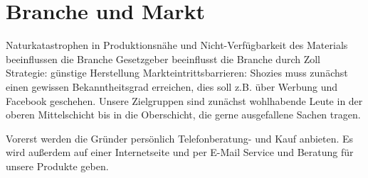 \chapter{Branche und Markt}
\label{cha:4}
Naturkatastrophen in Produktionsnähe und Nicht-Verfügbarkeit des Materials beeinflussen die Branche
Gesetzgeber beeinflusst die Branche durch Zoll
Strategie: günstige Herstellung
Markteintrittsbarrieren: Shozies muss zunächst einen gewissen Bekanntheitsgrad erreichen, dies soll z.B. über Werbung und Facebook geschehen.
Unsere Zielgruppen sind zunächst wohlhabende Leute in der oberen Mittelschicht bis in die Oberschicht, die gerne ausgefallene Sachen tragen.




Vorerst werden die Gründer persönlich Telefonberatung- und Kauf anbieten. Es wird außerdem auf einer Internetseite und per E-Mail Service und Beratung für unsere Produkte geben.